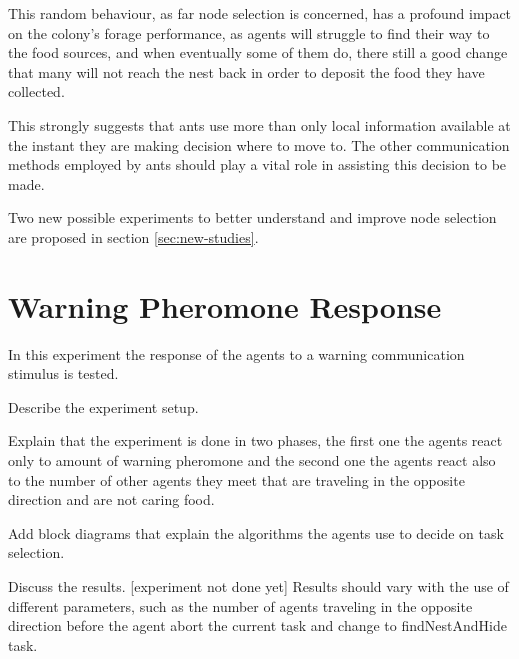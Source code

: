 This random behaviour, as far node selection is concerned, has a profound impact on the colony's forage performance, as agents will struggle to find their way to the food sources, and when eventually some of them do, there still a good change that many will not reach the nest back in order to deposit the food they have collected. 

This strongly suggests that ants use more than only local information available at the instant they are making decision where to move to. The other communication methods employed by ants should play a vital role in assisting this decision to be made.

Two new possible experiments to better understand and improve node selection are proposed in section \ref{sec:new-studies}. 

\section{Warning Pheromone Response}
\label{sec:warn-phero-inv}
In this experiment the response of the agents to a warning communication stimulus is tested.

Describe the experiment setup.

Explain that the experiment is done in two phases, the first one the agents react only to amount of warning pheromone and the second one the agents react also to the number of other agents they meet that are traveling in the opposite direction and are not caring food.

Add block diagrams that explain the algorithms the agents use to decide on task selection.

Discuss the results. [experiment not done yet]
Results should vary with the use of different parameters, such as the number of agents traveling in the opposite direction before the agent abort the current task and change to findNestAndHide task.
